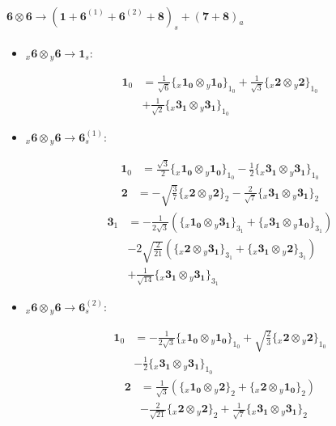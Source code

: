 \documentclass[english]{article}
\newcommand{\cgEqFontsize}{\large}
\newcommand{\rep}[1]{\mathbf{#1}}
\newcommand{\repx}[2]{{}_{#2}\mathbf{#1}}
\newcommand{\tsprod}[2]{\rep{#1}\otimes\rep{#2}}
\newcommand{\tsprodx}[2]{\repx{#1}{x}\otimes\repx{#2}{y}}
\newcommand{\subcgs}[3]{\big\{ \tsprodx{#1}{#2}\big\}^{}_{#3}}
\begin{document}
\paragraph*{\cgEqFontsize $\tsprod{6}{6}\to\left(\rep{1}+\rep{6}^{(1)}+\rep{6}^{(2)}+\rep{8}\right)_s+\left(\rep{7}+\rep{8}\right)_a$}
\begin{itemize}
\item $\tsprodx{6}{6}\to\rep{1}_{s}$:
\begin{fleqn}
\begin{align*}
\rep{1}_{0} & = \frac{1}{\sqrt{6}}\subcgs{1_{0}}{1_{0}}{1_{0}}+\frac{1}{\sqrt{3}}\subcgs{2}{2}{1_{0}} \\ 
 & +\frac{1}{\sqrt{2}}\subcgs{3_{1}}{3_{1}}{1_{0}}
\end{align*}
\end{fleqn}
\item $\tsprodx{6}{6}\to\rep{6}_{s}^{(1)}$:
\begin{fleqn}
\begin{align*}
\rep{1}_{0} & = \frac{\sqrt{3}}{2}\subcgs{1_{0}}{1_{0}}{1_{0}}-\frac{1}{2}\subcgs{3_{1}}{3_{1}}{1_{0}}
\end{align*}
\begin{align*}
\rep{2} & = -\sqrt{\frac{3}{7}}\subcgs{2}{2}{2}-\frac{2}{\sqrt{7}}\subcgs{3_{1}}{3_{1}}{2}
\end{align*}
\begin{align*}
\rep{3}_{1} & = -\frac{1}{2 \sqrt{3}}\left(\subcgs{1_{0}}{3_{1}}{3_{1}}+\subcgs{3_{1}}{1_{0}}{3_{1}}\right) \\ 
 & -2 \sqrt{\frac{2}{21}}\left(\subcgs{2}{3_{1}}{3_{1}}+\subcgs{3_{1}}{2}{3_{1}}\right) \\ 
 & +\frac{1}{\sqrt{14}}\subcgs{3_{1}}{3_{1}}{3_{1}}
\end{align*}
\end{fleqn}
\item $\tsprodx{6}{6}\to\rep{6}_{s}^{(2)}$:
\begin{fleqn}
\begin{align*}
\rep{1}_{0} & = -\frac{1}{2 \sqrt{3}}\subcgs{1_{0}}{1_{0}}{1_{0}}+\sqrt{\frac{2}{3}}\subcgs{2}{2}{1_{0}} \\ 
 & -\frac{1}{2}\subcgs{3_{1}}{3_{1}}{1_{0}}
\end{align*}
\begin{align*}
\rep{2} & = \frac{1}{\sqrt{3}}\left(\subcgs{1_{0}}{2}{2}+\subcgs{2}{1_{0}}{2}\right) \\ 
 & -\frac{2}{\sqrt{21}}\subcgs{2}{2}{2}+\frac{1}{\sqrt{7}}\subcgs{3_{1}}{3_{1}}{2}
\end{align*}

\end{fleqn}
\end{itemize}
\end{document}
